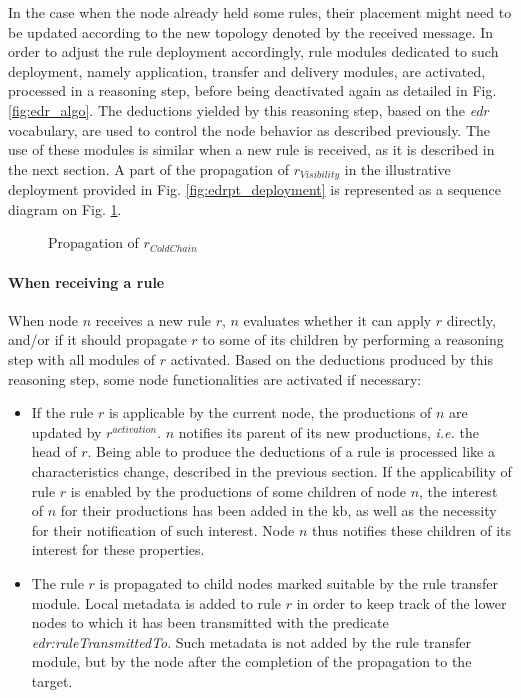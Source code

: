 \documentclass{iosart2c}
\begin{document}
In the case when the node already held some rules, their placement might need to be updated according to the new topology denoted by the received message.
In order to adjust the rule deployment accordingly, rule modules dedicated to such deployment, namely application, transfer and delivery modules, are activated, processed in a reasoning step, before being deactivated again as detailed in Fig. \ref{fig:edr_algo}.
The deductions yielded by this reasoning step, based on the \textit{edr} vocabulary, are used to control the node behavior as described previously.
The use of these modules is similar when a new rule is received, as it is described in the next section.
A part of the propagation of $r_{Visibility}$ in the illustrative deployment provided in Fig. \ref{fig:edrpt_deployment} is represented as a sequence diagram on Fig. \ref{fig:seq_temperaturegap}.

\begin{figure}
	\centering
	\caption{Propagation of $r_{ColdChain}$}
	\label{fig:seq_temperaturegap}
	\scalebox{0.8}{
		
	}
\end{figure}

\paragraph{When receiving a rule}

When node $n$ receives a new rule $r$, $n$ evaluates whether it can apply $r$ directly, and/or if it should propagate $r$ to some of its children by performing a reasoning step with all modules of $r$ activated. 
Based on the deductions produced by this reasoning step, some node functionalities are activated if necessary: 
\begin{itemize}
	\item If the rule $r$ is applicable by the current node, the productions of $n$ are updated by $r^{activation}$.
	$n$ notifies its parent of its new productions, \textit{i.e.} the head of $r$.
	Being able to produce the deductions of a rule is processed like a characteristics change, described in the previous section.
	If the applicability of rule $r$ is enabled by the productions of some children of node $n$, the interest of $n$ for their productions has been added in the \gls{kb}, as well as the necessity for their notification of such interest.
	Node $n$ thus notifies these children of its interest for these properties.
	\item The rule $r$ is propagated to child nodes marked suitable by the rule transfer module. 
	Local metadata is added to rule $r$ in order to keep track of the lower nodes to which it has been transmitted with the predicate \textit{edr:rule\-Transmitted\-To}. 
	Such metadata is not added by the rule transfer module, but by the node after the completion of the propagation to the target.
\end{itemize}
\end{document}
